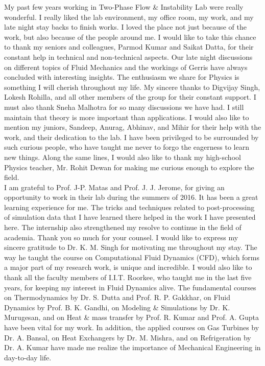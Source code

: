 \begin{acknowledgements}
My past few years working in Two-Phase Flow \& Instability Lab were really wonderful. I really liked the lab environment, my office room, my work, and my late night stay backs to finish works. I loved the place not just because of the work, but also because of the people around me. I would like to take this chance to thank my seniors and colleagues, Parmod Kumar and Saikat Datta, for their constant help in technical and non-technical aspects. Our late night discussions on different topics of Fluid Mechanics and the workings of Gerris have always concluded with interesting insights. The enthusiasm we share for Physics is something I will cherish throughout my life. My sincere thanks to Digvijay Singh, Lokesh Rohilla, and all other members of the group for their constant support. I must also thank Sneha Malhotra for so many discussions we have had. I still maintain that theory is more important than applications. I would also like to mention my juniors, Sandeep, Anurag, Abhinav, and Mihir for their help with the work, and their dedication to the lab. I have been privileged to be surrounded by such curious people, who have taught me never to forgo the eagerness to learn new things. Along the same lines, I would also like to thank my high-school Physics teacher, Mr. Rohit Dewan for making me curious enough to explore the field.\\
I am grateful to Prof. J-P. Matas and Prof. J. J. Jerome, for giving an opportunity to work in their lab during the summers of 2016. It has been a great learning experience for me. The tricks and techniques related to post-processing of simulation data that I have learned there helped in the work I have presented here. The internship also strengthened my resolve to continue in the field of academia. Thank you so much for your counsel. I would like to express my sincere gratitude to Dr. K. M. Singh for motivating me throughout my stay. The way he taught the course on Computational Fluid Dynamics (CFD), which forms a major part of my research work, is unique and incredible. I would also like to thank all the faculty members of I.I.T. Roorkee, who taught me in the last five years, for keeping my interest in Fluid Dynamics alive. The fundamental courses on Thermodynamics by Dr. S. Dutta and Prof. R. P. Gakkhar, on Fluid Dynamics by Prof. B. K. Gandhi, on Modeling \& Simulations by Dr. K. Murugesan, and on Heat \& mass transfer by Prof. R. Kumar and Prof. A. Gupta have been vital for my work. In addition, the applied courses on Gas Turbines by Dr. A. Bansal, on Heat Exchangers by Dr. M. Mishra, and on Refrigeration by Dr. A. Kumar have made me realize the importance of Mechanical Engineering in day-to-day life.\\

\end{acknowledgements}
